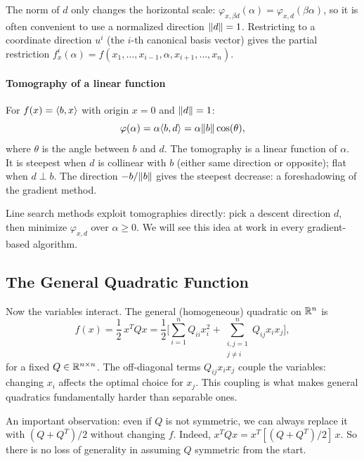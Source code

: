 The norm of $d$ only changes the horizontal scale: $\varphi_{x, \beta d}(\alpha) = \varphi_{x, d}(\beta \alpha)$, so it is often convenient to use a normalized direction $\lVert d\rVert = 1$.
Restricting to a coordinate direction $u^i$ (the $i$-th canonical basis vector) gives the partial restriction $f_x^i(\alpha) = f(x_1, \dots, x_{i-1}, \alpha, x_{i+1}, \dots, x_n)$.

\paragraph{Tomography of a linear function}

For $f(x) = \langle b, x\rangle$ with origin $x = 0$ and $\lVert d\rVert = 1$:
\begin{equation}\label{eq:tomography-linear}
	\varphi(\alpha) = \alpha \langle b, d\rangle = \alpha \lVert b\rVert \cos(\theta),
\end{equation}
where $\theta$ is the angle between $b$ and $d$.
The tomography is a linear function of $\alpha$.
It is steepest when $d$ is collinear with $b$ (either same direction or opposite); flat when $d \perp b$.
The direction $-b / \lVert b\rVert$ gives the steepest decrease: a foreshadowing of the gradient method.

Line search methods exploit tomographies directly: pick a descent direction $d$, then minimize $\varphi_{x,d}$ over $\alpha \geq 0$.
We will see this idea at work in every gradient-based algorithm.


\subsection{The General Quadratic Function}\label{sec:general-quad}

Now the variables interact.
The general (homogeneous) quadratic on $\mathbb{R}^n$ is
\begin{equation}\label{eq:homogeneous-quad}
	f(x) = \frac{1}{2}\, x^T Q x
	= \frac{1}{2} \biggl[\sum_{i=1}^{n} Q_{ii} x_i^2
		+ \sum_{\substack{i,j=1 \\ j \neq i}}^{n} Q_{ij} x_i x_j\biggr],
\end{equation}
for a fixed $Q \in \mathbb{R}^{n \times n}$.
The off-diagonal terms $Q_{ij} x_i x_j$ couple the variables: changing $x_i$ affects the optimal choice for $x_j$.
This coupling is what makes general quadratics fundamentally harder than separable ones.

An important observation: even if $Q$ is not symmetric, we can always replace it with $(Q + Q^T)/2$ without changing $f$.
Indeed, $x^T Q x = x^T [(Q + Q^T)/2]\, x$.
So there is no loss of generality in assuming $Q$ symmetric from the start.

